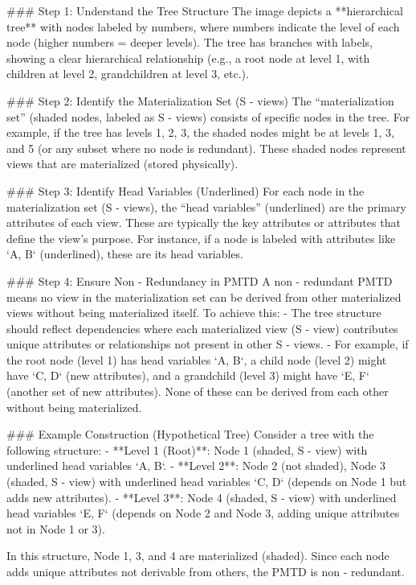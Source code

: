 ### Step 1: Understand the Tree Structure  
The image depicts a **hierarchical tree** with nodes labeled by numbers, where numbers indicate the level of each node (higher numbers = deeper levels). The tree has branches with labels, showing a clear hierarchical relationship (e.g., a root node at level 1, with children at level 2, grandchildren at level 3, etc.).  


### Step 2: Identify the Materialization Set (S - views)  
The “materialization set” (shaded nodes, labeled as S - views) consists of specific nodes in the tree. For example, if the tree has levels 1, 2, 3, the shaded nodes might be at levels 1, 3, and 5 (or any subset where no node is redundant). These shaded nodes represent views that are materialized (stored physically).  


### Step 3: Identify Head Variables (Underlined)  
For each node in the materialization set (S - views), the “head variables” (underlined) are the primary attributes of each view. These are typically the key attributes or attributes that define the view’s purpose. For instance, if a node is labeled with attributes like `A, B` (underlined), these are its head variables.  


### Step 4: Ensure Non - Redundancy in PMTD  
A non - redundant PMTD means no view in the materialization set can be derived from other materialized views without being materialized itself. To achieve this:  
- The tree structure should reflect dependencies where each materialized view (S - view) contributes unique attributes or relationships not present in other S - views.  
- For example, if the root node (level 1) has head variables `A, B`, a child node (level 2) might have `C, D` (new attributes), and a grandchild (level 3) might have `E, F` (another set of new attributes). None of these can be derived from each other without being materialized.  


### Example Construction (Hypothetical Tree)  
Consider a tree with the following structure:  
- **Level 1 (Root)**: Node 1 (shaded, S - view) with underlined head variables `A, B`.  
- **Level 2**: Node 2 (not shaded), Node 3 (shaded, S - view) with underlined head variables `C, D` (depends on Node 1 but adds new attributes).  
- **Level 3**: Node 4 (shaded, S - view) with underlined head variables `E, F` (depends on Node 2 and Node 3, adding unique attributes not in Node 1 or 3).  

In this structure, Node 1, 3, and 4 are materialized (shaded). Since each node adds unique attributes not derivable from others, the PMTD is non - redundant.  


